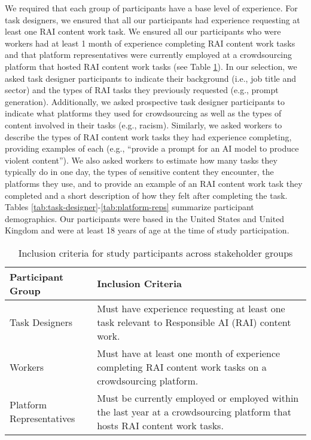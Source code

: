 We required that each group of participants have a base level of experience. For task designers, we ensured that all our participants had experience requesting at least one RAI content work task. We ensured all our participants who were workers had at least 1 month of experience completing RAI content work tasks and that platform representatives were currently employed at a crowdsourcing platform that hosted RAI content work tasks (see Table \ref{tab:inclusion-criteria}). In our selection, we asked task designer participants to indicate their background (i.e., job title and sector) and the types of RAI tasks they previously requested (e.g., prompt generation). Additionally, we asked prospective task designer participants to indicate what platforms they used for crowdsourcing as well as the types of content involved in their tasks (e.g., racism). Similarly, we asked workers to describe the types of RAI content work tasks they had experience completing, providing examples of each (e.g., ``provide a prompt for an AI model to produce violent content''). We also asked workers to estimate how many tasks they typically do in one day, the types of sensitive content they encounter, the platforms they use, and to provide an example of an RAI content work task they completed and a short description of how they felt after completing the task. Tables \ref{tab:task-designer}-\ref{tab:platform-reps} summarize participant demographics. Our participants were based in the United States and United Kingdom and were at least 18 years of age at the time of study participation. 


\begin{table}[ht]
\centering
\begin{tabular}{|p{4cm}|p{10cm}|}
\hline
\textbf{Participant Group} & \textbf{Inclusion Criteria} \\
\hline
Task Designers & Must have experience requesting at least one task relevant to Responsible AI (RAI) content work. \\
\hline
Workers & Must have at least one month of experience completing RAI content work tasks on a crowdsourcing platform. \\
\hline
Platform Representatives & Must be currently employed or employed within the last year at a crowdsourcing platform that hosts RAI content work tasks. \\
\hline
\end{tabular}
\caption{Inclusion criteria for study participants across stakeholder groups}
\label{tab:inclusion-criteria}
\end{table}




